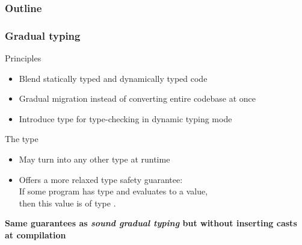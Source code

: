 
\begin{frame}
\frametitle{Outline} 
\tableofcontents[currentsection]
\end{frame}

\begin{frame}
\frametitle{Gradual typing}
\begin{block}{Principles}
\begin{itemize}
\setlength{\itemsep}{-2pt}
\item Blend statically typed and dynamically typed code
\item Gradual migration instead of converting entire codebase at once
\item Introduce  type for type-checking in dynamic typing mode
\end{itemize}
\end{block}

\begin{block}{The  type}
\begin{itemize}
\setlength{\itemsep}{-0pt}
\item May turn into any other type at runtime
\item Offers a more relaxed type safety guarantee:\\
 If some program  has type  and evaluates to a value, \\
      then this value is of type .
\end{itemize}
\end{block}
\pause\vspace{-4mm}
\begin{exampleblock}{\vspace{-5mm}}
\centering\bf  Same guarantees as \emph{sound gradual typing} but {\color{purple}without inserting
  casts at compilation}
\end{exampleblock}

\end{frame}

